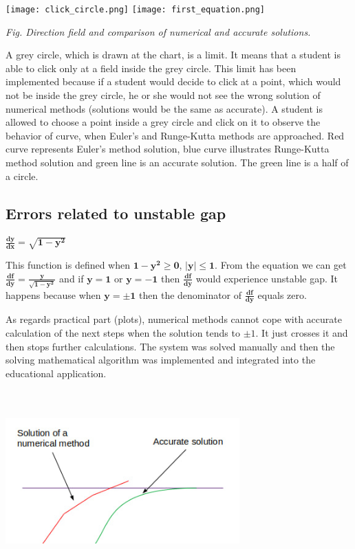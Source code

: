 \documentclass{article}
\begin{document}
\texttt{[image: click\_circle.png]}
\texttt{[image: first\_equation.png]} 
\centerline{\textit{Fig. Direction field and comparison of numerical and accurate solutions.}}

\vspace{20mm}

A grey circle, which is drawn at the chart, is a limit. It means that a student is able to click only at a field inside the grey circle. This limit has been implemented because if a student would decide to click at a point, which would not be inside the grey circle, he or she would not see the wrong solution of numerical methods (solutions would be the same as accurate). A student is allowed to choose a point inside a grey circle and click on it to observe the behavior of curve, when Euler's and Runge-Kutta methods are approached. Red curve represents Euler's method solution, blue curve illustrates Runge-Kutta method solution and green line is an accurate solution. The green line is a half of a circle.


\subsection{Errors related to unstable gap}
\begin{myequation}
    \centerline{$\boldsymbol{\frac{dy}{dx} = \sqrt{1 - y^2}}$}
\end{myequation}
This function is defined when $\boldsymbol{1 - y^2 \geq 0}$, $\boldsymbol{\lvert y \rvert \le 1}$. From the equation we can get $\boldsymbol{\frac{df}{dy} = \frac{y}{\sqrt{1 - y^2}}}$ and if $\boldsymbol{y = 1}$ or $\boldsymbol{y = -1}$ then $\boldsymbol{\frac{df}{dy}}$ would experience unstable gap. It happens because when $\boldsymbol{y = \pm 1}$ then the denominator of $\boldsymbol{\frac{df}{dy}}$ equals zero.
\par As regards practical part (plots), numerical methods cannot cope with accurate calculation of the next steps when the solution tends to $\pm 1$. It just crosses it and then stops further calculations.
The system was solved manually and then the solving mathematical algorithm was implemented and integrated into the educational application.
\vspace{15mm}
\begin{center}
\includegraphics[width=9cm, height=7cm]{paint2.jpg}
\end{center}
\end{document}
